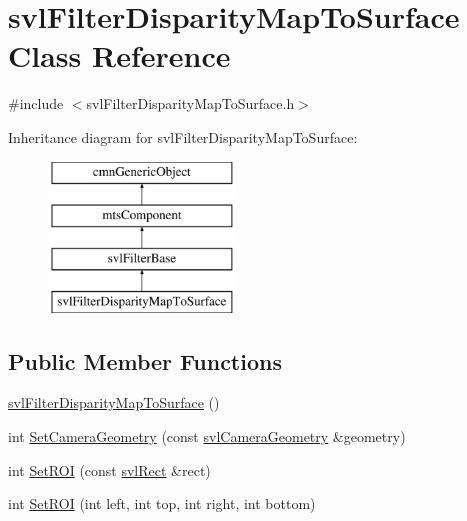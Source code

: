 \hypertarget{classsvl_filter_disparity_map_to_surface}{\section{svl\-Filter\-Disparity\-Map\-To\-Surface Class Reference}
\label{classsvl_filter_disparity_map_to_surface}
}


{\ttfamily \#include $<$svl\-Filter\-Disparity\-Map\-To\-Surface.\-h$>$}

Inheritance diagram for svl\-Filter\-Disparity\-Map\-To\-Surface\-:\begin{figure}[H]
\begin{center}
\leavevmode
\includegraphics[height=4.000000cm]{dc/df1/classsvl_filter_disparity_map_to_surface}
\end{center}
\end{figure}
\subsection*{Public Member Functions}
\begin{DoxyCompactItemize}
\item 
\hyperlink{classsvl_filter_disparity_map_to_surface_af0416e86b3cdf61170a11ee63968bb28}{svl\-Filter\-Disparity\-Map\-To\-Surface} ()
\item 
int \hyperlink{classsvl_filter_disparity_map_to_surface_a21180672d1dc7fcf7eaef2656c0a56c0}{Set\-Camera\-Geometry} (const \hyperlink{classsvl_camera_geometry}{svl\-Camera\-Geometry} \&geometry)
\item 
int \hyperlink{classsvl_filter_disparity_map_to_surface_adcf2a1aaac3f0810de11ba63d3655326}{Set\-R\-O\-I} (const \hyperlink{structsvl_rect}{svl\-Rect} \&rect)
\item 
int \hyperlink{classsvl_filter_disparity_map_to_surface_a86d309b8caa98415ca8017a4938e8d4e}{Set\-R\-O\-I} (int left, int top, int right, int bottom)
\end{DoxyCompactItemize}
